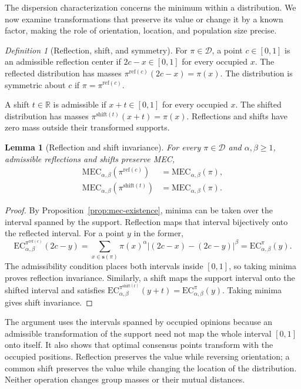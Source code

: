 \documentclass{article}
\theoremstyle{plain}
\newtheorem{lemma}{Lemma}
\theoremstyle{remark}
\newtheorem{definition}{Definition}
\begin{document}
The dispersion characterization concerns the minimum within a distribution. We now examine transformations that preserve its value or change it by a known factor, making the role of orientation, location, and population size precise.

\begin{definition}[Reflection, shift, and symmetry]\label{def:mec-reflections-shifts}
For $\pi\in\mathcal{D}$, a point $c\in[0,1]$ is an admissible reflection center if $2c-x\in[0,1]$ for every occupied $x$. The reflected distribution has masses $\pi^{\mathrm{ref}(c)}(2c-x)=\pi(x)$. The distribution is symmetric about $c$ if $\pi=\pi^{\mathrm{ref}(c)}$.

A shift $t\in\mathbb{R}$ is admissible if $x+t\in[0,1]$ for every occupied $x$. The shifted distribution has masses $\pi^{\mathrm{shift}(t)}(x+t)=\pi(x)$. Reflections and shifts have zero mass outside their transformed supports.
\end{definition}

\begin{lemma}[Reflection and shift invariance]\label{lem:mec-geometric-invariance}
For every $\pi\in\mathcal{D}$ and $\alpha,\beta\geq1$, admissible reflections and shifts preserve MEC,
\begin{equation}\label{eq:mec-geometric-invariance}
\begin{aligned}
\mathrm{MEC}_{\alpha,\beta}(\pi^{\mathrm{ref}(c)})
 &=\mathrm{MEC}_{\alpha,\beta}(\pi),\\
\mathrm{MEC}_{\alpha,\beta}(\pi^{\mathrm{shift}(t)})
 &=\mathrm{MEC}_{\alpha,\beta}(\pi).
\end{aligned}
\end{equation}
\end{lemma}
\begin{proof}
By Proposition~\ref{prop:mec-existence}, minima can be taken over the interval spanned by the support. Reflection maps that interval bijectively onto the reflected interval. For a point $y$ in the former,
\[
\mathrm{EC}_{\alpha,\beta}^{\pi^{\mathrm{ref}(c)}}(2c-y)
=\sum_{x\in\boldsymbol{s}(\pi)}\pi(x)^\alpha|(2c-x)-(2c-y)|^\beta
=\mathrm{EC}_{\alpha,\beta}^{\pi}(y).
\]
The admissibility condition places both intervals inside $[0,1]$, so taking minima proves reflection invariance. Similarly, a shift maps the support interval onto the shifted interval and satisfies $\mathrm{EC}_{\alpha,\beta}^{\pi^{\mathrm{shift}(t)}}(y+t)=\mathrm{EC}_{\alpha,\beta}^{\pi}(y)$. Taking minima gives shift invariance.
\end{proof}
The argument uses the intervals spanned by occupied opinions because an admissible transformation of the support need not map the whole interval $[0,1]$ onto itself. It also shows that optimal consensus points transform with the occupied positions. Reflection preserves the value while reversing orientation; a common shift preserves the value while changing the location of the distribution. Neither operation changes group masses or their mutual distances.
\end{document}
